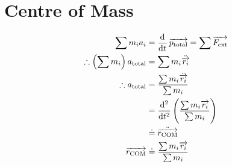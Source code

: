 \documentclass[fleqn]{article}
\theoremstyle{definition}
\theoremstyle{theorem}
\begin{document}
\section{Centre of Mass}

\begin{align*}
	\sum m_i a_i &= \dod{}{t} \overrightarrow{p_{\text{total}}} = \sum \overrightarrow{F_{\text{ext}}} \\
	\therefore \left(\sum m_i\right) a_{\text{total}} &= \sum m_i \ddot{\overrightarrow{r_i}} \\
	\therefore a_{\text{total}} &= \dfrac{\sum m_i \ddot{\overrightarrow{r_i}}}{\sum m_i} \\
	&= \dod[2]{}{t} \left(\dfrac{\sum m_i \overrightarrow{r_i}}{\sum m_i} \right)\\
	&\doteq \ddot{\overrightarrow{r_{\text{COM}}}}\\
	\overrightarrow{r_{\text{COM}}} &\doteq \dfrac{\sum m_i \overrightarrow{r_i}}{\sum m_i}
\end{align*}
\end{document}

